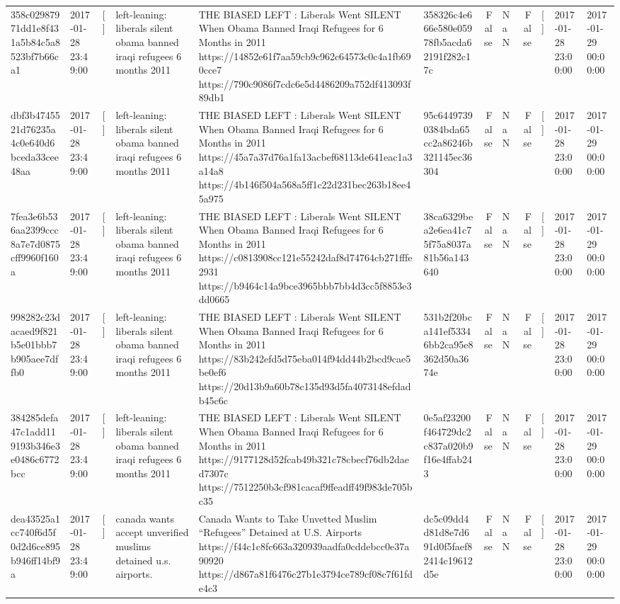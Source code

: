 \begin{tabular}{llllllrlrlll}
358c02987971dd1e8f431a5b84c5a8523bf7b66ca1 & 2017-01-28 23:49:00 & [] & left-leaning: liberals silent obama banned iraqi refugees 6 months 2011 & THE BIASED LEFT : Liberals Went SILENT When Obama Banned Iraqi Refugees for 6 Months in 2011 https://14852e61f7aa59cb9c962c64573c0c4a1fb690cce7 https://790c9086f7cdc6e5d4486209a752df413093f89db1 & 358326c4e666e580e05978fb5acda62191f282c17c & False & NaN & False & [] & 2017-01-28 23:00:00 & 2017-01-29 00:00:00 \\
dbf3b4745521d76235a4c0e640d6bceda33cee48aa & 2017-01-28 23:49:00 & [] & left-leaning: liberals silent obama banned iraqi refugees 6 months 2011 & THE BIASED LEFT : Liberals Went SILENT When Obama Banned Iraqi Refugees for 6 Months in 2011 https://45a7a37d76a1fa13acbef68113de641eac1a3a14a8 https://4b146f504a568a5ff1c22d231bec263b18ee45a975 & 95c64497390384bda65cc2a86246b321145ec36304 & False & NaN & False & [] & 2017-01-28 23:00:00 & 2017-01-29 00:00:00 \\
7fea3e6b536aa2399ccc8a7e7d0875cff9960f160a & 2017-01-28 23:49:00 & [] & left-leaning: liberals silent obama banned iraqi refugees 6 months 2011 & THE BIASED LEFT : Liberals Went SILENT When Obama Banned Iraqi Refugees for 6 Months in 2011 https://c0813908cc121e55242daf8d74764cb271fffe2931 https://b9464c14a9bce3965bbb7bb4d3cc5f8853e3dd0665 & 38ca6329bea2e6ea41c75f75a8037a81b56a143640 & False & NaN & False & [] & 2017-01-28 23:00:00 & 2017-01-29 00:00:00 \\
998282c23dacaed9f821b5e01bbb7b905aee7dffb0 & 2017-01-28 23:49:00 & [] & left-leaning: liberals silent obama banned iraqi refugees 6 months 2011 & THE BIASED LEFT : Liberals Went SILENT When Obama Banned Iraqi Refugees for 6 Months in 2011 https://83b242efd5d75eba014f94dd44b2bcd9cae5be0ef6 https://20d13b9a60b78c135d93d5fa4073148efdadb45c6c & 531b2f20bca141ef53346bb2ca95e8362d50a3674e & False & NaN & False & [] & 2017-01-28 23:00:00 & 2017-01-29 00:00:00 \\
384285defa47c1add119193b346e3e0486c6772bcc & 2017-01-28 23:49:00 & [] & left-leaning: liberals silent obama banned iraqi refugees 6 months 2011 & THE BIASED LEFT : Liberals Went SILENT When Obama Banned Iraqi Refugees for 6 Months in 2011 https://9177128d52fcab49b321c78cbecf76db2daed7307c https://7512250b3cf981cacaf9ffeadff49f983de705bc35 & 0e5af23200f464729dc2c837a020b9f16e4ffab243 & False & NaN & False & [] & 2017-01-28 23:00:00 & 2017-01-29 00:00:00 \\
dea43525a1cc740f6d5f0d2d6ce895b946ff14bf9a & 2017-01-28 23:49:00 & [] & canada wants accept unverified muslims detained u.s. airports. & Canada Wants to Take Unvetted Muslim “Refugees” Detained at U.S. Airports https://f44c1c8fc663a320939aadfa0cddebcc0e37a90920 https://d867a81f6476c27b1e3794ce789cf08c7f61fde4c3 & dc5c09dd4d81d8e7d691d0f5faef82414c19612d5e & False & NaN & False & [] & 2017-01-28 23:00:00 & 2017-01-29 00:00:00 \\

\end{tabular}
